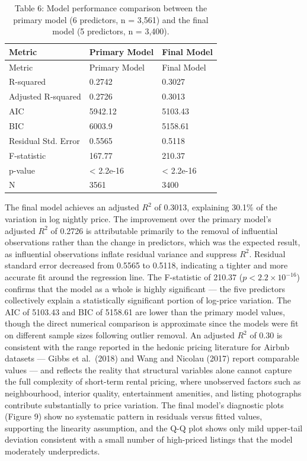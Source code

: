 \documentclass[
]{article}
\begin{document}
\begin{longtable}[]{@{}lll@{}}
\caption{Table 6: Model performance comparison between the primary model
(6 predictors, n = 3,561) and the final model (5 predictors, n =
3,400).}\tabularnewline
\toprule\noalign{}
Metric & Primary Model & Final Model \\
\midrule\noalign{}
\endfirsthead
\toprule\noalign{}
Metric & Primary Model & Final Model \\
\midrule\noalign{}
\endhead
\bottomrule\noalign{}
\endlastfoot
R-squared & 0.2742 & 0.3027 \\
Adjusted R-squared & 0.2726 & 0.3013 \\
AIC & 5942.12 & 5103.43 \\
BIC & 6003.9 & 5158.61 \\
Residual Std. Error & 0.5565 & 0.5118 \\
F-statistic & 167.77 & 210.37 \\
p-value & \textless{} 2.2e-16 & \textless{} 2.2e-16 \\
N & 3561 & 3400 \\
\end{longtable}

The final model achieves an adjusted \(R^2\) of 0.3013, explaining
30.1\% of the variation in log nightly price. The improvement over the
primary model's adjusted \(R^2\) of 0.2726 is attributable primarily to
the removal of influential observations rather than the change in
predictors, which was the expected result, as influential observations
inflate residual variance and suppress \(R^2\). Residual standard error
decreased from 0.5565 to 0.5118, indicating a tighter and more accurate
fit around the regression line. The F-statistic of 210.37
(\(p < 2.2 \times 10^{-16}\)) confirms that the model as a whole is
highly significant --- the five predictors collectively explain a
statistically significant portion of log-price variation. The AIC of
5103.43 and BIC of 5158.61 are lower than the primary model values,
though the direct numerical comparison is approximate since the models
were fit on different sample sizes following outlier removal. An
adjusted \(R^2\) of 0.30 is consistent with the range reported in the
hedonic pricing literature for Airbnb datasets --- Gibbs et al.~(2018)
and Wang and Nicolau (2017) report comparable values --- and reflects
the reality that structural variables alone cannot capture the full
complexity of short-term rental pricing, where unobserved factors such
as neighbourhood, interior quality, entertainment amenities, and listing
photographs contribute substantially to price variation. The final
model's diagnostic plots (Figure 9) show no systematic pattern in
residuals versus fitted values, supporting the linearity assumption, and
the Q-Q plot shows only mild upper-tail deviation consistent with a
small number of high-priced listings that the model moderately
underpredicts.
\end{document}

